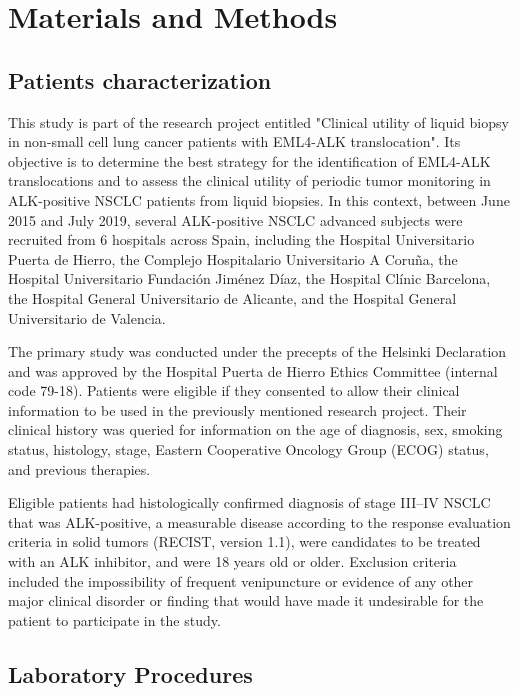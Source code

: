 \chapter{Materials and Methods}

\section{Patients characterization}

This study is part of the research project entitled "Clinical utility of liquid biopsy in non-small cell lung cancer patients with EML4-ALK translocation". Its objective is to determine the best strategy for the identification of EML4-ALK translocations and to assess the clinical utility of periodic tumor monitoring in ALK-positive NSCLC patients from liquid biopsies. In this context, between June 2015 and July 2019, several ALK-positive NSCLC advanced subjects were recruited from 6 hospitals across Spain, including the Hospital Universitario Puerta de Hierro, the Complejo Hospitalario Universitario A Coruña, the Hospital Universitario Fundación Jiménez Díaz, the Hospital Clínic Barcelona, the Hospital General Universitario de Alicante, and the Hospital General Universitario de Valencia.

The primary study was conducted under the precepts of the Helsinki Declaration and was approved by the Hospital Puerta de Hierro Ethics Committee (internal code 79-18). Patients were eligible if they consented to allow their clinical information to be used in the previously mentioned research project. Their clinical history was queried for information on the age of diagnosis, sex, smoking status, histology, stage, Eastern Cooperative Oncology Group (ECOG) status, and previous therapies.

Eligible patients had histologically confirmed diagnosis of stage III–IV NSCLC that was ALK-positive, a measurable disease according to the response evaluation criteria in solid tumors (RECIST, version 1.1), were candidates to be treated with an ALK inhibitor, and were 18 years old or older. Exclusion criteria included the impossibility of frequent venipuncture or evidence of any other major clinical disorder or finding that would have made it undesirable for the patient to participate in the study.

\section{Laboratory Procedures}

